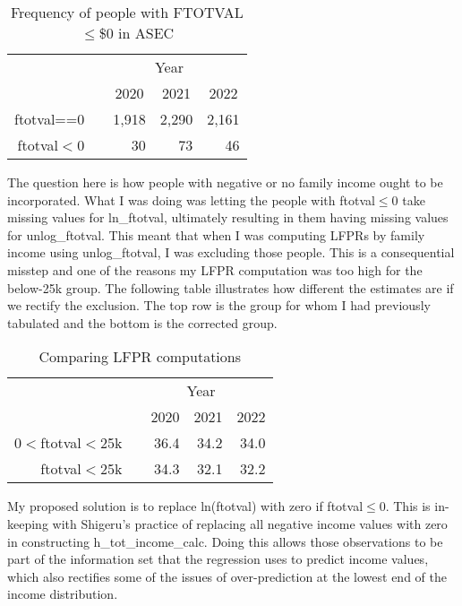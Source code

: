 \documentclass{article}
\newcommand{\mct}[1]{\multicolumn{1}{c}{#1}}
\newcommand{\mc}[3]{\multicolumn{#1}{#2}{#3}}
\begin{document}
	 \begin{table}[H]
	 	\centering
	 	\caption{Frequency of people with FTOTVAL$\le$\$0 in ASEC}
	 	\begin{tabularx}{0.8\textwidth}{@{\extracolsep{\fill}}r r r r r }
	 		\toprule 
	 		& \mc{4}{c}{Year}  \\ \cmidrule(lr){2-5}
	 		& 		&	\mct{2020}	&	\mct{2021}	&	\mct{2022}	\\ \midrule
	 		ftotval==0 \hspace{0.1cm}  	&	&	1,918	&	2,290	&	2,161	\\
	 		ftotval$<$0 \hspace{0.1cm}  	&	&	30	&	73	&	46	\\
	 		\bottomrule
	 	\end{tabularx}
	 \end{table} 
	
	The question here is how people with negative or no family income ought to be incorporated. What I was doing was letting the people with ftotval$\le$0 take missing values for ln\_ftotval, ultimately resulting in them having missing values for unlog\_ftotval. This meant that when I was computing LFPRs by family income using unlog\_ftotval, I was excluding those people. This is a consequential misstep and one of the reasons my LFPR computation was too high for the below-25k group.
	The following table illustrates how different the estimates are if we rectify the exclusion. The top row is the group for whom I had previously tabulated and the bottom is the corrected group. 
	
	\begin{table}[H]
		\centering
		\caption{Comparing LFPR computations}
		\begin{tabularx}{0.8\textwidth}{@{\extracolsep{\fill}}r r r r r }
			\toprule 
			& \mc{4}{c}{Year}  \\ \cmidrule(lr){2-5}
			& 		&	\mct{2020}	&	\mct{2021}	&	\mct{2022}	\\ \midrule
			0$<$ftotval$<$25k \hspace{0.1cm}  	&	&	36.4	&	34.2	&	34.0	\\
			ftotval$<$25k \hspace{0.1cm}  	&	&	34.3	&	32.1	&	32.2	\\
			\bottomrule
		\end{tabularx}
	\end{table} 
	
	My proposed solution is to replace ln(ftotval) with zero if ftotval$\le$0. This is in-keeping with Shigeru's practice of replacing all negative income values with zero in constructing h\_tot\_income\_calc. Doing this allows those observations to be part of the information set that the regression uses to predict income values, which also rectifies some of the issues of over-prediction at the lowest end of the income distribution. 	
	
\end{document}
